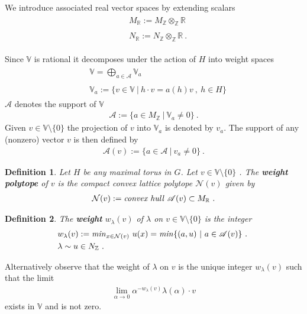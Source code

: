 \documentclass[12pt]{amsart}
\newtheorem{definition}{Definition}
\numberwithin{equation}{section}
\numberwithin{remark}{section}
\numberwithin{theorem}{section}
\numberwithin{proposition}{section}
\numberwithin{definition}{section}
\numberwithin{lemma}{section}
\numberwithin{claim}{section}
\numberwithin{corollary}{section}
\numberwithin{conjecture}{section}
\begin{document}
 We introduce associated real vector spaces by extending scalars 
\begin{align} 
 \begin{split}
 &M_{\mathbb{R}}:= M_{\mathbb{Z}}\otimes_{\mathbb{Z}}\mathbb{R} \\
\ \\
& N_{\mathbb{R}}:= N_{\mathbb{Z}}\otimes_{\mathbb{Z}}\mathbb{R}\ .
\end{split}
\end{align}

Since $\mathbb{V}$ is rational it decomposes under the action of $H$ into  {weight spaces}
\begin{align}
\begin{split}
&\mathbb{V}=\bigoplus_{a\in {\mathscr{A}}}\mathbb{V}_{a}  \\
\ \\
& \mathbb{V}_{a}:=\{v\in \mathbb{V}\ |\ h\cdot v=a(h) v \ , \ h\in H\}
\end{split}
\end{align}
$\mathscr{A}$ denotes  the {support} of $\mathbb{V}$ 
\begin{align}
\mathscr{A}:= \{a \in M_{\mathbb{Z}}\ | \ \mathbb{V}_{a}\neq 0\} \ .
\end{align}
Given $v\in \mathbb{V}\setminus \{0\}$  the projection of $v$ into $\mathbb{V}_{a}$ is denoted by $v_{a}$. The support of any (nonzero) vector $v$ is then defined by
\begin{align}
\mathscr{A}(v):= \{a\in \mathscr{A}\ | \ v_{a}\neq 0\} \ .
\end{align}
\begin{definition} \emph{ Let $H$ be any maximal torus in $G$. Let $v\in \mathbb{V}\setminus\{0\}$ . The \textbf{\emph{weight polytope}} of $v$ is the compact convex lattice polytope $\mathcal{N}(v)$ given by}
\begin{align}\label{wtpolytope}
\mathcal{N}(v):=\mbox{\emph{convex hull}}\ \mathscr{A}(v) \subset M_{\mathbb{R}} \ .
\end{align}
\end{definition}

\begin{definition}
\emph{The \textbf{\emph{weight}}  $w_{\lambda}(v)$  of $\lambda$ on $v\in \mathbb{V}\setminus \{0\}$ is the integer}
\begin{align}
\begin{split}
&w_{\lambda}(v):= \mbox{\emph{min}}_{  x\in \mathcal{N}(v) }\ {u}(x)= \mbox{\emph{min}} \{ (a,u )\ |\  a \in \mathscr{A}(v)\}\ .
\ \\
& \lambda \sim u\in N_{\mathbb{Z}} \ .
\end{split}
\end{align}
\end{definition}
Alternatively observe that the weight of $\lambda$ on $v$ is the unique integer $w_{\lambda}(v)$ such that the limit
\begin{align}
\lim_{\alpha{\ensuremath{\longrightarrow}} 0}\alpha^{-w_{\lambda}(v)}\lambda(\alpha)\cdot v
\end{align}
exists in $\mathbb{V}$ and is not zero.
\end{document}
